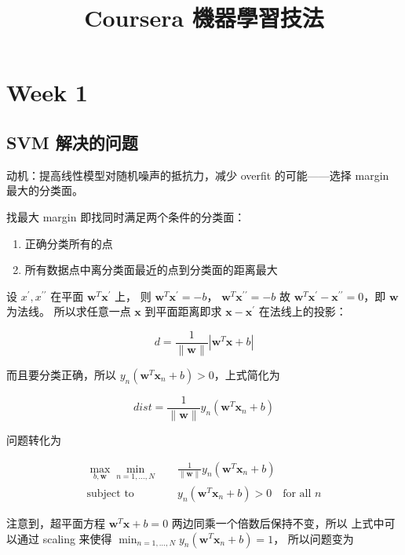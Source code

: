 \documentclass[a4paper]{article}
\begin{document}
\title{Coursera 機器學習技法}
\maketitle

\section{Week 1}
\subsection{SVM 解决的问题}
动机：提高线性模型对随机噪声的抵抗力，减少 overfit 的可能——选择 margin 最大的分类面。

找最大 margin 即找同时满足两个条件的分类面：
\begin{enumerate}
  \item 正确分类所有的点
  \item 所有数据点中离分类面最近的点到分类面的距离最大
\end{enumerate}

设 $x^{\prime}, x^{\prime\prime}$ 在平面 $\mathbf{w}^{T}\mathbf{x}^{\prime}$ 上，
则
$\mathbf{w}^{T}\mathbf{x}^{\prime} = -b$，
$\mathbf{w}^{T}\mathbf{x}^{\prime\prime} = -b$
故
$\mathbf{w}^{T}\mathbf{x^{\prime} - x^{\prime\prime}} = 0$，即 $\mathbf{w}$ 为法线。
所以求任意一点 $\mathbf{x}$ 到平面距离即求 $\mathbf{x - x^{\prime}}$ 在法线上的投影：

$$d = \frac{1}{\|\mathbf{w}\|}|\mathbf{w}^{T}\mathbf{x} + b|$$

而且要分类正确，所以 $y_n(\mathbf{w}^{T}\mathbf{x}_n + b) > 0$，上式简化为

$$dist = \frac{1}{\|\mathbf{w}\|}y_n(\mathbf{w}^{T}\mathbf{x}_n + b)$$

问题转化为

\begin{equation}
\begin{aligned}
\max_{b, \mathbf{w}} \min_{n=1,\dots,N} \quad &\frac{1}{\|\mathbf{w}\|}y_n(\mathbf{w}^{T}\mathbf{x}_n + b) \\
\text{subject to} \quad& y_n(\mathbf{w}^{T}\mathbf{x}_n + b) > 0 \quad \text{for all } n
\end{aligned}
\end{equation}

注意到，超平面方程 $\mathbf{w}^{T}\mathbf{x} + b = 0$ 两边同乘一个倍数后保持不变，所以
上式中可以通过 scaling 来使得 $\displaystyle \min_{n=1,\dots,N}y_n(\mathbf{w}^{T}\mathbf{x}_n + b) = 1$，
所以问题变为
\end{document}
